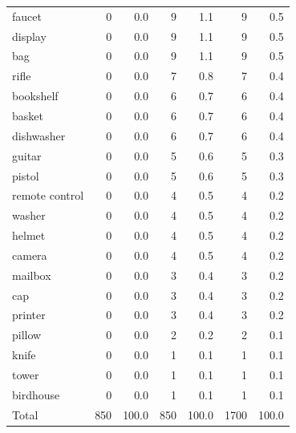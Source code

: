 \begin{table}[ht]
\begin{tabular}{lrrrrrr}
    faucet & 0 & 0.0 & 9 & 1.1 & 9 & 0.5 \\
    display & 0 & 0.0 & 9 & 1.1 & 9 & 0.5 \\
    bag & 0 & 0.0 & 9 & 1.1 & 9 & 0.5 \\
    rifle & 0 & 0.0 & 7 & 0.8 & 7 & 0.4 \\
    bookshelf & 0 & 0.0 & 6 & 0.7 & 6 & 0.4 \\
    basket & 0 & 0.0 & 6 & 0.7 & 6 & 0.4 \\
    dishwasher & 0 & 0.0 & 6 & 0.7 & 6 & 0.4 \\
    guitar & 0 & 0.0 & 5 & 0.6 & 5 & 0.3 \\
    pistol & 0 & 0.0 & 5 & 0.6 & 5 & 0.3 \\
    remote control & 0 & 0.0 & 4 & 0.5 & 4 & 0.2 \\
    washer & 0 & 0.0 & 4 & 0.5 & 4 & 0.2 \\
    helmet & 0 & 0.0 & 4 & 0.5 & 4 & 0.2 \\
    camera & 0 & 0.0 & 4 & 0.5 & 4 & 0.2 \\
    mailbox & 0 & 0.0 & 3 & 0.4 & 3 & 0.2 \\
    cap & 0 & 0.0 & 3 & 0.4 & 3 & 0.2 \\
    printer & 0 & 0.0 & 3 & 0.4 & 3 & 0.2 \\
    pillow & 0 & 0.0 & 2 & 0.2 & 2 & 0.1 \\
    knife & 0 & 0.0 & 1 & 0.1 & 1 & 0.1 \\
    tower & 0 & 0.0 & 1 & 0.1 & 1 & 0.1 \\
    birdhouse & 0 & 0.0 & 1 & 0.1 & 1 & 0.1 \\
    \midrule
    Total & 850 & 100.0 & 850 & 100.0 & 1700 & 100.0 \\
    \bottomrule
  \end{tabular}
\end{table}
